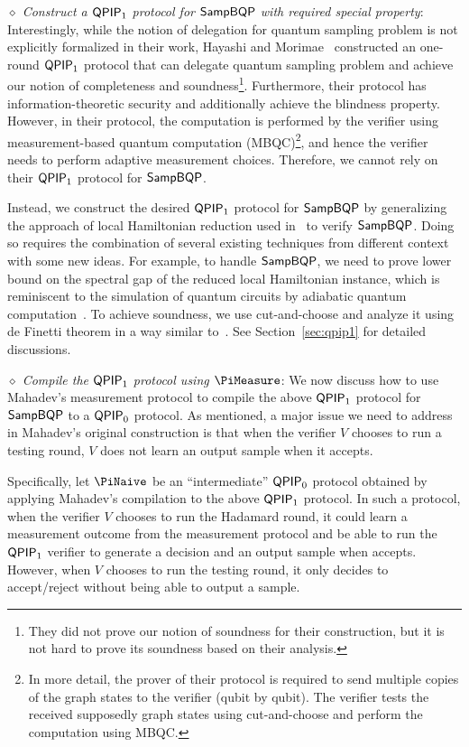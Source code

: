 \emph{$\diamond$ Construct a $\operatorname{\mathsf{QPIP}}_1$ protocol for $\operatorname{\mathsf{SampBQP}}$ with required special property}: Interestingly, while the notion of delegation for quantum sampling problem is not explicitly formalized in their work, Hayashi and Morimae~\cite{hayashi2015verifiable} constructed an one-round $\operatorname{\mathsf{QPIP}}_1$ protocol that can delegate quantum sampling problem and achieve our notion of completeness and soundness\footnote{They did not prove our notion of soundness for their construction, but it is not hard to prove its soundness based on their analysis.}. Furthermore, their protocol has information-theoretic security and additionally achieve the blindness property. However, in their protocol, the computation is performed by the verifier using measurement-based quantum computation (MBQC)\footnote{In more detail, the prover of their protocol is required to send multiple copies of the graph states to the verifier (qubit by qubit). The verifier tests the received supposedly graph states using cut-and-choose and perform the computation using MBQC.}, and hence the verifier needs to perform adaptive measurement choices. Therefore, we cannot rely on their $\operatorname{\mathsf{QPIP}}_1$ protocol for $\operatorname{\mathsf{SampBQP}}$. 

Instead, we construct the desired $\operatorname{\mathsf{QPIP}}_1$ protocol for $\operatorname{\mathsf{SampBQP}}$ by generalizing the approach of local Hamiltonian reduction used in~\cite{PhysRevA.93.022326, mf16} to verify $\operatorname{\mathsf{SampBQP}}$. Doing so requires the combination of several existing techniques from different context with some new ideas. For example, to handle $\operatorname{\mathsf{SampBQP}}$, we need to prove lower bound on the spectral gap of the reduced local Hamiltonian instance, which is reminiscent to the simulation of quantum circuits by adiabatic quantum computation~\cite{adiabatic}. To achieve soundness, we use cut-and-choose and analyze it using de Finetti theorem in a  way similar to~\cite{takeuchi2018verification,hayashi2015verifiable}. See Section~\ref{sec:qpip1} for detailed discussions.



\emph{$\diamond$ Compile the $\operatorname{\mathsf{QPIP}}_1$ protocol using $\PiMeasure$}: We now discuss how to use Mahadev's measurement protocol to compile the above $\operatorname{\mathsf{QPIP}}_1$ protocol for $\operatorname{\mathsf{SampBQP}}$ to a $\operatorname{\mathsf{QPIP}}_0$ protocol. As mentioned, a major issue we need to address in Mahadev's original construction is that when the verifier $V$ chooses to run a testing round, $V$ does not learn an output sample when it accepts.  %

Specifically, let $\PiNaive$ be an ``intermediate'' $\operatorname{\mathsf{QPIP}}_0$ protocol obtained by applying Mahadev's compilation to the above $\operatorname{\mathsf{QPIP}}_1$ protocol. In such a protocol, when the verifier $V$ chooses to run the Hadamard round, it could learn a measurement outcome from the measurement protocol and be able to run the $\operatorname{\mathsf{QPIP}}_1$ verifier to generate a decision and an output sample when accepts. However, when  $V$ chooses to run the testing round, it only decides to accept/reject without being able to output a sample. 

